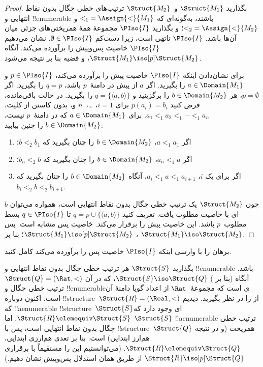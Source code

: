 \documentclass[../../../include/open-logic-section]{subfiles}
\begin{document}
\begin{proof}
  بگذارید $\Struct{M_1}$ و~$\Struct{M_2}$ ترتیب‌های خطی چگال بدون نقاط
  انتهایی و !!{enumerable} باشند، به‌گونه‌ای که
  ${<_1} = \Assign{<}{M_1}$ و ${<_2} = \Assign{<}{M_2}$؛ و بگذارید
  $\PIso{I}$ مجموعهٔ همهٔ همریختی‌های جزئی میان آن‌ها باشد. $\PIso{I}$
  ناتهی است، زیرا دست‌کم $\emptyset \in \PIso{I}$. نشان می‌دهیم
  $\PIso{I}$ خاصیت پس‌وپیش را برآورده می‌کند. آنگاه
  $\Struct{M_1} \iso[p] \Struct{M_2}$، و قضیه بنا بر
   نتیجه می‌شود.

  برای نشان‌دادن اینکه $\PIso{I}$ خاصیت پیش را برآورده می‌کند،
  $p \in \PIso{I}$ و $a \in \Domain{M_1}$ را بگیرید. اگر $a$ از پیش
  در دامنهٔ~$p$ باشد، $q=p$ را بگیرید. اگر $p=\emptyset$، هر
  $b \in \Domain{M_2}$ را برگزینید و
  $q=\{\langle a,b\rangle\}$ را بگیرید. در حالت باقی‌مانده، فرض کنید
  $p(a_i)=b_i$ برای $i = 1$، \dots،~$n$ و، بدون کاستن از کلیت،
  $a_1 <_1 a_2 <_1 \cdots <_1 a_n$. برای
  $a \in \Domain{M_1}$ که در دامنهٔ~$p$ نیست، $b \in \Domain{M_2}$ را
  چنین بیابید:
  \begin{enumerate}
  \item اگر $a <_1 a_1$، $b \in \Domain{M_2}$ را چنان بگیرید که
    $b <_2 b_1$؛
  \item اگر $a_n <_1 a$، $b \in \Domain{M_2}$ را چنان بگیرید که
    $b_n <_2 b$؛
  \item اگر برای یک $i$، $a_i <_1 a <_1 a_{i+1}$، آنگاه
    $b \in \Domain{M_2}$ را چنان بگیرید که
    $b_i <_2 b <_2 b_{i+1}$.
  \end{enumerate}
  چون $\Struct{M_2}$ یک ترتیب خطی چگال بدون نقاط انتهایی است، همواره
  می‌توان $b$ای با خاصیت مطلوب یافت. تعریف کنید
  $q = p \cup \{ \langle a, b \rangle \}$ تا $q \in \PIso{I}$ بسط
  مطلوب~$p$ باشد. این خاصیت پیش را برقرار می‌کند. خاصیت پس مشابه است.
  پس $\Struct{M_1} \iso[p] \Struct{M_2}$؛ بنا بر
  ، $\Struct{M_1} \iso \Struct{M_2}$.
\end{proof}

\begin{prob}
  برهان  را با وارسی اینکه
  $\PIso{I}$ خاصیت پس را برآورده می‌کند کامل کنید.
\end{prob}

\begin{rem}
  بگذارید $\Struct{S}$ هر ترتیب خطی چگال بدون نقاط انتهایی و
  !!{enumerable} باشد. آنگاه (بنا بر )
  $\Struct{S} \iso \Struct{Q}$، که در آن
  $\Struct{Q} = (\Rat, <)$ ترتیب خطی چگال و !!{enumerable}ی است که
  مجموعهٔ~$\Rat$ از اعداد گویا دامنهٔ آن است. اکنون دوباره
  !!{structure}~$\Struct{R} = (\Real, <)$ از
   را در نظر بگیرید. دیدیم که !!a{enumerable}
  !!{structure}~$\Struct{S}$ای وجود دارد که
  $\Struct{R} \elemequiv \Struct{S}$. اما $\Struct{S}$
  !!a{enumerable} ترتیب خطی چگال بدون نقاط انتهایی است، پس با
  !!{structure}~$\Struct{Q}$ همریخت (و در نتیجه هم‌ارز ابتدایی) است.
  بنا بر تعدی هم‌ارزی ابتدایی، $\Struct{R} \elemequiv \Struct{Q}$.
  (می‌توانستیم این را مستقیماً با برقراری
  $\Struct{R} \iso[p] \Struct{Q}$ از طریق همان استدلال پس‌وپیش نشان
  دهیم.)
\end{rem}
\end{document}
